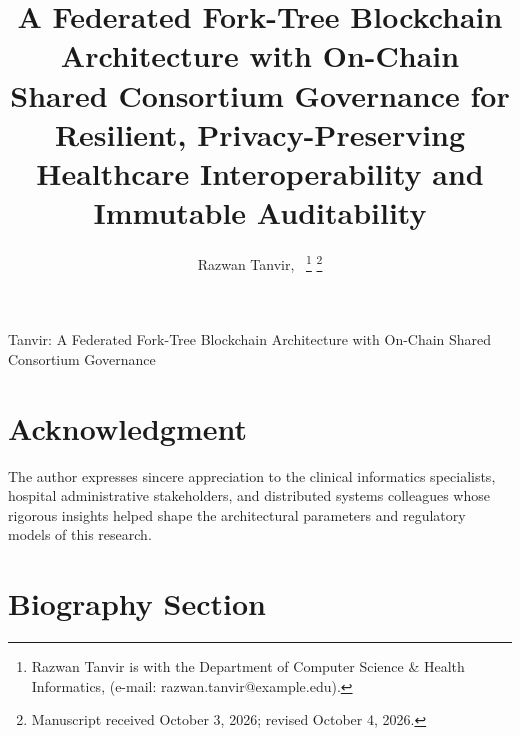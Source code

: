 \documentclass[lettersize,journal]{IEEEtran}
\theoremstyle{definition}
\begin{document}
\title{A Federated Fork-Tree Blockchain Architecture with On-Chain Shared Consortium Governance for Resilient, Privacy-Preserving Healthcare Interoperability and Immutable Auditability}

\author{Razwan Tanvir,~%
\thanks{Razwan Tanvir is with the Department of Computer Science \& Health Informatics, (e-mail: razwan.tanvir@example.edu).}%
\thanks{Manuscript received October 3, 2026; revised October 4, 2026.}}

%
{Tanvir: A Federated Fork-Tree Blockchain Architecture with On-Chain Shared Consortium Governance}


\maketitle















\section*{Acknowledgment}
The author expresses sincere appreciation to the clinical informatics specialists, hospital administrative stakeholders, and distributed systems colleagues whose rigorous insights helped shape the architectural parameters and regulatory models of this research.




\newpage

\section{Biography Section}
\end{document}
